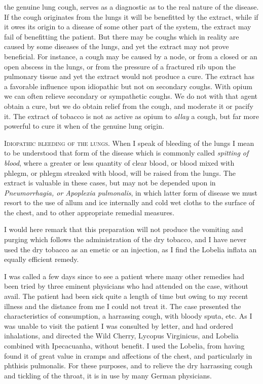 the genuine lung cough, serves as a diagnostic as to the real nature of
the disease. If the cough originates from the lungs it will be benefitted
by the extract, while if it owes its origin to a disease of some
other part of the system, the extract may fail of benefitting the
patient. But there may be coughs which in reality are caused by some
diseases of the lungs, and yet the extract may not prove beneficial.
For instance, a cough may be caused by a node, or from a closed or
an open abscess in the lungs, or from the pressure of a fractured rib
upon the pulmonary tissue and yet the extract would not produce a
cure. The extract has a favorable influence upon idiopathic but not
on secondary coughs. With opium we can often relieve secondary or
sympathetic coughs. We do not with that agent obtain a cure, but
we do obtain relief from the cough, and moderate it or pacify it. The
extract of tobacco is not as active as opium to \emph{allay} a cough, but far
more powerful to cure it when of the genuine lung origin.

\textsc{Idiopathic bleeding of the lungs.} When I speak of bleeding of the
lungs I mean to be understood that form of the disease which is commonly
called \emph{spitting of blood}, where a greater or less quantity of clear
blood, or blood mixed with phlegm, or phlegm streaked with blood,
will be raised from the lungs. The extract is valuable in these cases,
but may not be depended upon in \emph{Pneumorrhagia, or Apoplexia pulmonalis},
in which latter form of disease we must resort to the use of
allum and ice internally and cold wet cloths to the surface of the
chest, and to other appropriate remedial measures.

I would here remark that this preparation will not produce the vomiting
and purging which follows the administration of the dry tobacco,
and I have never used the dry tobacco as an emetic or an injection, as I
find the Lobelia inflata an equally efficient remedy.

I was called a few days since to see a patient where many other remedies
had been tried by three eminent physicians who had attended on
the case, without avail. The patient had been sick quite a length of
time but owing to my recent illness and the distance from me I could
not treat it. The case presented the characteristics of consumption, a
harrassing cough, with bloody sputa, etc. As I was unable to visit the
patient I was consulted by letter, and had ordered inhalations, and directed
the Wild Cherry, Lycopus Virginicus, and Lobelia combined
with Ipecacuanha, without benefit. I used the Lobelia, from having
found it of great value in cramps and affections of the chest, and
particularly in phthisis pulmonalis. For these purposes, and to relieve
the dry harrassing cough and tickling of the throat, it is in use
by many German physicians.\endinput
